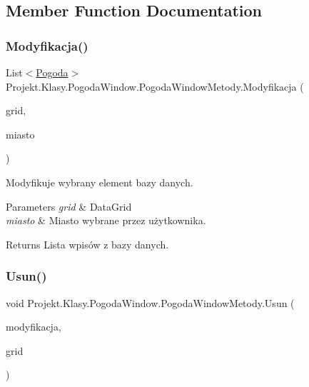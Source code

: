 \subsection{Member Function Documentation}
\mbox{\label{class_projekt_1_1_klasy_1_1_pogoda_window_1_1_pogoda_window_metody_a23b9223b25600a2e23299874d9acb739}} 
\subsubsection{\texorpdfstring{Modyfikacja()}{Modyfikacja()}}
{\footnotesize\ttfamily List$<$\mbox{\hyperlink{class_projekt_1_1_baza_1_1_pogoda}{Pogoda}}$>$ Projekt.\+Klasy.\+Pogoda\+Window.\+Pogoda\+Window\+Metody.\+Modyfikacja (\begin{DoxyParamCaption}\item[{Data\+Grid}]{grid,  }\item[{string}]{miasto }\end{DoxyParamCaption})}



Modyfikuje wybrany element bazy danych. 


\begin{DoxyParams}{Parameters}
{\em grid} & Data\+Grid\\
\hline
{\em miasto} & Miasto wybrane przez użytkownika.\\
\hline
\end{DoxyParams}
\begin{DoxyReturn}{Returns}
Lista wpisów z bazy danych.
\end{DoxyReturn}
\mbox{\label{class_projekt_1_1_klasy_1_1_pogoda_window_1_1_pogoda_window_metody_ae8f5a295de3223c1ff949760eb1ce36e}} 
\subsubsection{\texorpdfstring{Usun()}{Usun()}}
{\footnotesize\ttfamily void Projekt.\+Klasy.\+Pogoda\+Window.\+Pogoda\+Window\+Metody.\+Usun (\begin{DoxyParamCaption}\item[{List$<$ \mbox{\hyperlink{class_projekt_1_1_baza_1_1_pogoda}{Pogoda}} $>$}]{modyfikacja,  }\item[{ref Data\+Grid}]{grid }\end{DoxyParamCaption})}



